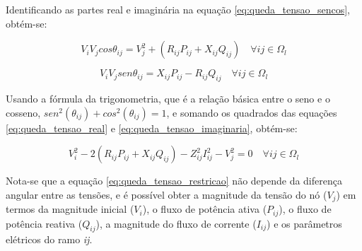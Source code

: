 Identificando as partes real e imaginária na equação \ref{eq:queda_tensao_sencos}, obtém-se:

\begin{equation}
    V_{i}V_{j}cos\theta_{ij} = V_{j}^{2} + (R_{ij}P_{ij} + X_{ij}Q_{ij})\quad\forall ij \in \Omega_{l}
    \label{eq:queda_tensao_real}
\end{equation}

\begin{equation}
    V_{i}V_{j}sen\theta_{ij} = X_{ij}P_{ij} - R_{ij}Q_{ij}\quad\forall ij \in \Omega_{l}
    \label{eq:queda_tensao_imaginaria}
\end{equation}

Usando a fórmula da trigonometria, que é a relação básica entre o seno e o cosseno, $sen^{2}(\theta_{ij}) + cos^{2}(\theta_{ij}) = 1$, e somando os quadrados das equações \ref{eq:queda_tensao_real} e \ref{eq:queda_tensao_imaginaria}, obtém-se:

\begin{equation}
    V_{i}^{2} - 2(R_{ij}P_{ij} + X_{ij}Q_{ij}) - Z_{ij}^{2}I_{ij}^{2} - V_{j}^{2} = 0\quad\forall ij \in \Omega_{l}
    \label{eq:queda_tensao_restricao}
\end{equation}

Nota-se que a equação \ref{eq:queda_tensao_restricao} não depende da diferença angular entre as tensões, e é possível obter a magnitude da tensão do nó ($V_j$) em termos da magnitude inicial ($V_i$), o fluxo de potência ativa ($P_{ij}$), o fluxo de potência reativa ($Q_{ij}$), a magnitude do fluxo de corrente ($I_{ij}$) e os parâmetros elétricos do ramo \textit{ij}.
